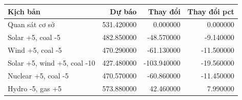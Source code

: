 \begin{tabular}{p{6.2cm}rrr}
\toprule
Kịch bản & Dự báo & Thay đổi & Thay đổi pct \\
\midrule
Quan sát cơ sở & 531.420000 & 0.000000 & 0.000000 \\
Solar +5, coal -5 & 482.850000 & -48.570000 & -9.140000 \\
Wind +5, coal -5 & 470.290000 & -61.130000 & -11.500000 \\
Solar +5, wind +5, coal -10 & 427.480000 & -103.940000 & -19.560000 \\
Nuclear +5, coal -5 & 470.570000 & -60.860000 & -11.450000 \\
Hydro -5, gas +5 & 573.880000 & 42.460000 & 7.990000 \\
\bottomrule
\end{tabular}
